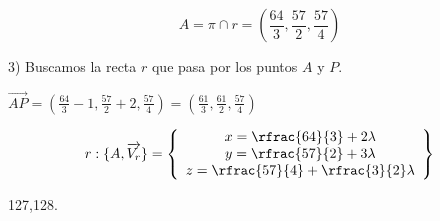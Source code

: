 \begin{problem}
\[A = \pi\cap r = \left(\frac{64}{3},\frac{57}{2},\frac{57}{4}\right)\]

3) Buscamos la recta $r$ que pasa por los puntos $A$ y $P$. 

$\vec{AP} = \left(\frac{64}{3}-1,\frac{57}{2}+2,\frac{57}{4}\right) =  \left(\frac{61}{3},\frac{61}{2},\frac{57}{4}\right)$

\[r : \{A,\vec{V_r}\} = \left\{\begin{array}{c}
    x = \rfrac{64}{3} + 2\lambda\\
    y = \rfrac{57}{2} + 3\lambda\\
    z = \rfrac{57}{4} + \rfrac{3}{2}\lambda
\end{array}\right\}\]

\end{problem}

127,128.

